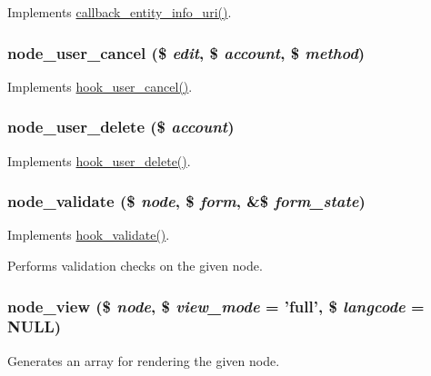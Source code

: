 \label{node_8module_aa809f2afb7e8cba7f972b1fa7bc4fc38}
Implements \hyperlink{group__callbacks_ga42bf4e69ee32b2bc99d0d774d4917254}{callback\_\-entity\_\-info\_\-uri()}. \hypertarget{node_8module_a9411160c6584d13957fd07bd952f54df}{
\subsubsection[{node\_\-user\_\-cancel}]{\setlength{\rightskip}{0pt plus 5cm}node\_\-user\_\-cancel (\$ {\em edit}, \/  \$ {\em account}, \/  \$ {\em method})}}
\label{node_8module_a9411160c6584d13957fd07bd952f54df}
Implements \hyperlink{group__hooks_gad6223ddd2f0f52c331df8a3315d9a41e}{hook\_\-user\_\-cancel()}. \hypertarget{node_8module_a5c461dbda38fb52f70fbb45027f9a021}{
\subsubsection[{node\_\-user\_\-delete}]{\setlength{\rightskip}{0pt plus 5cm}node\_\-user\_\-delete (\$ {\em account})}}
\label{node_8module_a5c461dbda38fb52f70fbb45027f9a021}
Implements \hyperlink{group__hooks_ga2c0755857e486e8a770b44b496da9929}{hook\_\-user\_\-delete()}. \hypertarget{node_8module_a9f5f6b14ffa70a478e11e60b1fe9d254}{
\subsubsection[{node\_\-validate}]{\setlength{\rightskip}{0pt plus 5cm}node\_\-validate (\$ {\em node}, \/  \$ {\em form}, \/  \&\$ {\em form\_\-state})}}
\label{node_8module_a9f5f6b14ffa70a478e11e60b1fe9d254}
Implements \hyperlink{group__node__api__hooks_gacaf7cff104c642c28f76ce7ec5f33f40}{hook\_\-validate()}.

Performs validation checks on the given node. \hypertarget{node_8module_ac2c64fdfacc25be79a6ecf406ab62320}{
\subsubsection[{node\_\-view}]{\setlength{\rightskip}{0pt plus 5cm}node\_\-view (\$ {\em node}, \/  \$ {\em view\_\-mode} = {\ttfamily 'full'}, \/  \$ {\em langcode} = {\ttfamily NULL})}}
\label{node_8module_ac2c64fdfacc25be79a6ecf406ab62320}
Generates an array for rendering the given node.



